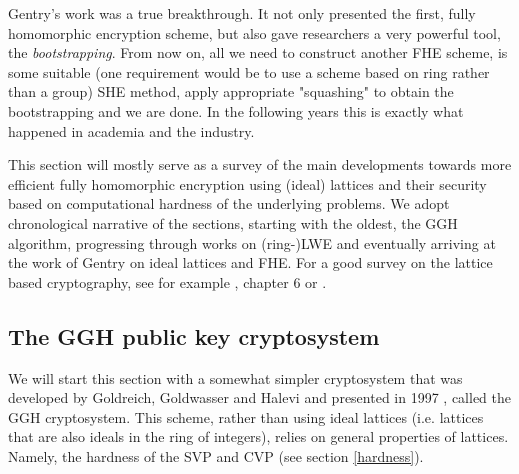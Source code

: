 Gentry's work was a true breakthrough. It not only presented the first, fully homomorphic encryption scheme, but also gave researchers a very powerful tool, the \textit{bootstrapping}. From now on, all we need to construct another FHE scheme, is some suitable (one requirement would be to use a scheme based on ring rather than a group) SHE method, apply appropriate "squashing" to obtain the bootstrapping and we are done. In the following years this is exactly what happened in academia and the industry.

This section will mostly serve as a survey of the main developments towards more efficient fully homomorphic encryption using (ideal) lattices and their security based on computational hardness of the underlying problems. We adopt chronological narrative of the sections, starting with the oldest, the GGH algorithm, progressing through works on (ring-)LWE and eventually arriving at the work of Gentry \cite{gentry_phd} on ideal lattices and FHE. For a good survey on the lattice based cryptography, see for example \cite{two_faces}, \cite{book} chapter 6 or \cite{lattice-survey}.

\subsection{The GGH public key cryptosystem}
We will start this section with a somewhat simpler cryptosystem that was developed by Goldreich, Goldwasser and Halevi and presented in 1997 \cite{ggh}, called the GGH cryptosystem. This scheme, rather than using ideal lattices (i.e. lattices that are also ideals in the ring of integers), relies on general properties of lattices. Namely, the hardness of the SVP and CVP (see section \ref{hardness}).

